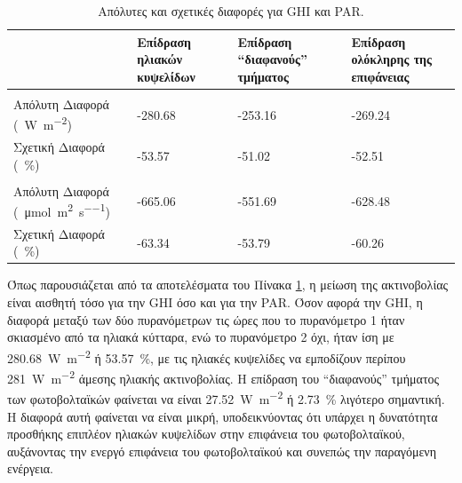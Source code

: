 \documentclass[12pt, a4paper]{report} %
\newcommand{\english}{\foreignlanguage{english}}
\begin{document}
\begin{table}[H]
    \caption{Απόλυτες και σχετικές διαφορές για \english{GHI} και \english{PAR}.}\label{tab_GHI_PAR_diffs}
    
    \begin{tabularx}{\textwidth}{>{\centering\arraybackslash}X >{\centering\arraybackslash}X >{\centering\arraybackslash}X >{\centering\arraybackslash}X}
    \toprule
    & \textbf{Επίδραση ηλιακών κυψελίδων} & \textbf{Επίδραση “διαφανούς” τμήματος} & \textbf{Επίδραση ολόκληρης της επιφάνειας} \\
    \midrule
    \multicolumn{1}{l}{} & \multicolumn{3}{c}{\textbf{\english{GHI}}} \\
    \cmidrule(lr){2-4}
    Απόλυτη Διαφορά (\SI{}{\watt\per\meter\squared}) & \vfill -280.68 \vfill & \vfill -253.16 \vfill & \vfill -269.24 \vfill \\
    Σχετική Διαφορά (\SI{}{\percent}) & \vfill -53.57 \vfill & \vfill -51.02 \vfill & \vfill -52.51 \vfill \\ 
    \cmidrule(lr){2-4}
    \multicolumn{1}{l}{} & \multicolumn{3}{c}{\textbf{\english{PAR}}} \\
    \cmidrule(lr){2-4}
    Απόλυτη Διαφορά (\SI{}{\micro\mol\per\meter\squared\per\second}) & \vfill -665.06 \vfill & \vfill -551.69 \vfill & \vfill -628.48 \vfill \\
    Σχετική Διαφορά (\SI{}{\percent}) & \vfill -63.34 \vfill & \vfill -53.79 \vfill & \vfill -60.26 \vfill \\
    \bottomrule
    \end{tabularx}
    
\end{table}

Όπως παρουσιάζεται από τα αποτελέσματα του Πίνακα \ref{tab_GHI_PAR_diffs}, η μείωση της ακτινοβολίας είναι αισθητή τόσο για την 
\english{GHI} όσο και για την \english{PAR}. Όσον αφορά την \english{GHI}, η διαφορά μεταξύ των δύο πυρανόμετρων τις ώρες που το πυρανόμετρο 1 ήταν σκιασμένο από τα 
ηλιακά κύτταρα, ενώ το πυρανόμετρο 2 όχι, ήταν ίση με \SI{280,68}{\watt\per\meter\squared} ή \SI{53.57}{\percent}, με τις 
ηλιακές κυψελίδες να εμποδίζουν περίπου \SI{281}{\watt\per\meter\squared} άμεσης ηλιακής ακτινοβολίας. Η επίδραση του 
“διαφανούς” τμήματος των φωτοβολταϊκών φαίνεται να είναι \SI{27.52}{\watt\per\meter\squared} ή \SI{2,73}{\percent} λιγότερο 
σημαντική. Η διαφορά αυτή φαίνεται να είναι μικρή, υποδεικνύοντας ότι υπάρχει η δυνατότητα προσθήκης επιπλέον ηλιακών κυψελίδων 
στην επιφάνεια του φωτοβολταϊκού, αυξάνοντας την ενεργό επιφάνεια του φωτοβολταϊκού και συνεπώς την παραγόμενη ενέργεια.
\end{document}
